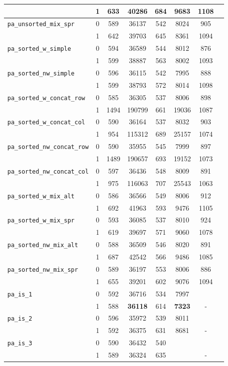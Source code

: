 \begin{table}[h]
\begin{tabular}{|l|c||c|c|c|c|c||c|}
		& 1 &  633 & 40286 & 684 & 9683 & 1108 \\ \hline
		\verb|pa_unsorted_mix_spr| & 0 & 589 & 36137 & 542 & 8024 & 905 \\ %
		& 1 &  642 & 39703 & 645 & 8361 & 1094 \\ \hline
		\verb|pa_sorted_w_simple| & 0 & 594 & 36589 & 544 & 8012 & 876 \\ %
		& 1 &  599 & 38887 & 563 & 8002 & 1093 \\ \hline
		\verb|pa_sorted_nw_simple| & 0 & 596 & 36115 & 542 & 7995 & 888 \\ %
		& 1 &  599 & 38793 & 572 & 8014 & 1098 \\ \hline
		\verb|pa_sorted_w_concat_row| & 0 & 585 & 36305 & 537 & 8006 & 898 \\ %
		& 1 &  1494 & 190799 & 661 & 19036 & 1087 \\ \hline
		\verb|pa_sorted_w_concat_col| & 0 & 590 & 36164 & 537 & 8032 & 903 \\ %
		& 1 &  954 & 115312 & 689 & 25157 & 1074 \\ \hline
		\verb|pa_sorted_nw_concat_row| & 0 & 590 & 35955 & 545 & 7999 & 897 \\ %
		& 1 & 1489 & 190657 & 693 & 19152 & 1073 \\ \hline
		\verb|pa_sorted_nw_concat_col| & 0  & 597 & 36436 & 548 & 8009 & 891 \\ %
		& 1 & 975 & 116063 & 707 & 25543  & 1063 \\ \hline
		\verb|pa_sorted_w_mix_alt| & 0 &  586 & 36566 & 549 & 8006  & 912 \\ %
		& 1 & 692 & 41963 & 593 & 9476 & 1105 \\ \hline
		\verb|pa_sorted_w_mix_spr| & 0 &  593 & 36085 &  537 & 8010 & 924 \\ %
		& 1 & 619 & 39697 & 571 &  9060 & 1078 \\ \hline
		\verb|pa_sorted_nw_mix_alt| & 0 & 588 & 36509 & 546 & 8020 & 891 \\ %
		& 1 &  687 & 42542 & 566 & 9486 & 1085 \\ \hline
		\verb|pa_sorted_nw_mix_spr| & 0 & 589 & 36197 & 553 &8006  & 886 \\ %
		& 1 &  655 & 39201 & 602 & 9076 & 1094 \\ \hline
		\verb|pa_is_1| & 0 & 592 & 36716 & 534 & 7997 & \\ 
		& 1 & 588 & \textbf{36118} & 614 & \textbf{7323} & - \\ \hline
		\verb|pa_is_2| & 0 & 596 & 35972 &  539 & 8011 &  \\ 
		& 1 & 592 & 36375 &  631 & 8681 & - \\ \hline
		\verb|pa_is_3| & 0 & 590 & 36432 & 540 & &\\ 
		& 1 & 589 & 36324 & 635 & & -\\ \hline


\end{tabular}
\end{table}
